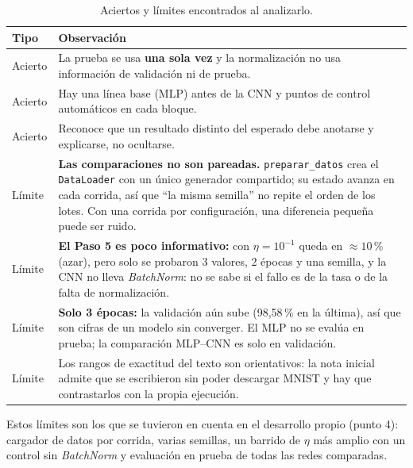 \documentclass[11pt,letterpaper]{article}
\begin{document}
\begin{table}[H]
\centering\small
\caption{Aciertos y límites encontrados al analizarlo.}
\begin{tabularx}{\linewidth}{@{}l L@{}}
\toprule
Tipo & Observación \\
\midrule
Acierto & La prueba se usa \textbf{una sola vez} y la normalización no usa información de validación ni de prueba. \\
Acierto & Hay una línea base (MLP) antes de la CNN y puntos de control automáticos en cada bloque. \\
Acierto & Reconoce que un resultado distinto del esperado debe anotarse y explicarse, no ocultarse. \\
Límite & \textbf{Las comparaciones no son pareadas.} \texttt{preparar\_datos} crea el \texttt{DataLoader} con un único generador compartido; su estado avanza en cada corrida, así que
          ``la misma semilla'' no repite el orden de los lotes. Con una corrida por configuración, una diferencia pequeña puede ser ruido. \\
Límite & \textbf{El Paso 5 es poco informativo:} con $\eta=10^{-1}$ queda en $\approx10$\,\% (azar), pero solo se probaron 3 valores, 2 épocas y una semilla, y la CNN no lleva
          \textit{BatchNorm}: no se sabe si el fallo es de la tasa o de la falta de normalización. \\
Límite & \textbf{Solo 3 épocas:} la validación aún sube (98,58\,\% en la última), así que son cifras de un modelo sin converger. El MLP no se evalúa en prueba; la comparación MLP--CNN es solo en validación. \\
Límite & Los rangos de exactitud del texto son orientativos: la nota inicial admite que se escribieron sin poder descargar MNIST y hay que contrastarlos con la propia ejecución. \\
\bottomrule
\end{tabularx}
\end{table}

Estos límites son los que se tuvieron en cuenta en el desarrollo propio (punto 4): cargador de datos por corrida, varias semillas, un barrido de $\eta$ más amplio con un control sin \textit{BatchNorm}
y evaluación en prueba de todas las redes comparadas.
\end{document}
